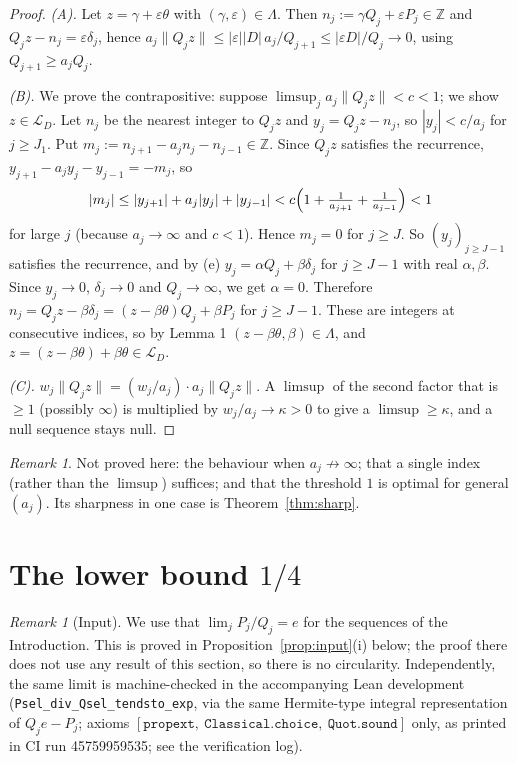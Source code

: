 \documentclass[11pt]{amsart}
\theoremstyle{remark}
\newtheorem{remark}[theorem]{Remark}
\newcommand{\Z}{\mathbb{Z}}
\newcommand{\dist}[1]{\lVert #1\rVert}
\newcommand{\LL}{\mathcal{L}}
\begin{document}
\begin{proof}
\emph{(A).} Let $z=\gamma+\varepsilon\theta$ with $(\gamma,\varepsilon)\in\Lambda$. Then
$n_j:=\gamma Q_j+\varepsilon P_j\in\Z$ and $Q_jz-n_j=\varepsilon\delta_j$, hence
$a_j\dist{Q_jz}\le|\varepsilon||D|\,a_j/Q_{j+1}\le|\varepsilon D|/Q_j\to0$, using $Q_{j+1}\ge a_jQ_j$.

\emph{(B).} We prove the contrapositive: suppose $\limsup_j a_j\dist{Q_jz}<c<1$; we show $z\in\LL_D$.
Let $n_j$ be the nearest integer to $Q_jz$ and $y_j=Q_jz-n_j$, so $|y_j|<c/a_j$ for $j\ge J_1$.
Put $m_j:=n_{j+1}-a_jn_j-n_{j-1}\in\Z$. Since $Q_j z$ satisfies the recurrence,
$y_{j+1}-a_jy_j-y_{j-1}=-m_j$, so
\[
|m_j|\le|y_{j+1}|+a_j|y_j|+|y_{j-1}|<c\Bigl(1+\tfrac1{a_{j+1}}+\tfrac1{a_{j-1}}\Bigr)<1
\]
for large $j$ (because $a_j\to\infty$ and $c<1$). Hence $m_j=0$ for $j\ge J$. So $(y_j)_{j\ge J-1}$
satisfies the recurrence, and by (e) $y_j=\alpha Q_j+\beta\delta_j$ for $j\ge J-1$ with real
$\alpha,\beta$. Since $y_j\to0$, $\delta_j\to0$ and $Q_j\to\infty$, we get $\alpha=0$. Therefore
$n_j=Q_jz-\beta\delta_j=(z-\beta\theta)Q_j+\beta P_j$ for $j\ge J-1$. These are integers at
consecutive indices, so by Lemma 1 $(z-\beta\theta,\beta)\in\Lambda$, and $z=(z-\beta\theta)+\beta\theta\in\LL_D$.

\emph{(C).} $w_j\dist{Q_jz}=(w_j/a_j)\cdot a_j\dist{Q_jz}$. A $\limsup$ of the second factor that
is $\ge1$ (possibly $\infty$) is multiplied by $w_j/a_j\to\kappa>0$ to give a $\limsup\ge\kappa$,
and a null sequence stays null. \qedhere
\end{proof}

\begin{remark}
Not proved here: the behaviour when $a_j\not\to\infty$; that a single index (rather than the
$\limsup$) suffices; and that the threshold $1$ is optimal for general $(a_j)$.
Its sharpness in one case is Theorem~\ref{thm:sharp}.
\end{remark}

\section{The lower bound $1/4$}\label{sec:lower}

\begin{remark}[Input]\label{rem:input}
We use that $\lim_jP_j/Q_j=e$ for the sequences of the Introduction. This is proved in
Proposition~\ref{prop:input}(i) below; the proof there does not use any result of this section,
so there is no circularity. Independently, the same limit is machine-checked in the accompanying
Lean development (\texttt{Psel\_div\_Qsel\_tendsto\_exp}, via the same Hermite-type integral
representation of $Q_je-P_j$; axioms $[\texttt{propext},\ \texttt{Classical.choice},\ \texttt{Quot.sound}]$
only, as printed in CI run 45759959535; see the verification log).
\end{remark}
\end{document}
